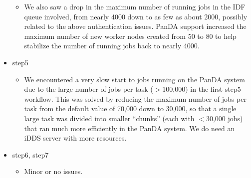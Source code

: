 \begin{itemize}
\begin{itemize}
  \item
  We also saw a drop in the maximum number of running jobs in the IDF queue involved, from nearly 4000 down to as few as about 2000, possibly related to the above authentication issues.
  PanDA support increased the maximum number of new worker nodes created from
50 to 80 to help stabilize the number of running jobs back to nearly 4000.


\end{itemize} %

\item step5
\begin{itemize}

  \item
  We encountered a very slow start to jobs running on the PanDA system due to the large number of jobs per task ($>$100,000) in the first step5 workflow.
  This was solved by reducing the maximum number of jobs per task from the default value of 70,000 down to 30,000, so that a single large task was divided into smaller ``chunks'' (each with $<$30,000 jobs) that ran much more efficiently in the PanDA system.
We do need an  iDDS server with more resources.

\end{itemize} %

\item step6, step7
\begin{itemize}

  \item Minor or no issues.

\end{itemize} %

\end{itemize} %

